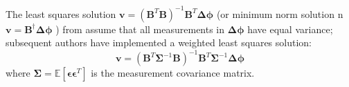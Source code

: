 
The least squares solution $ \bm{v} = (\bm{B}^T \bm{B})^{-1}\bm{B}^T \bm{\Delta \phi} $ (or minimum norm solution n $ \bm{v} = \bm{B}^{\dagger} \bm{\Delta \phi}$ ) from \cite{Berardino2002NewAlgorithmSurface} assume that all measurements in $\bm{\Delta \phi}$ have equal variance; subsequent authors have implemented a weighted least squares solution:
\begin{equation}
	\bm{v} = (\bm{B}^T \bm{\Sigma}^{-1} \bm{B})^{-1}\bm{B}^T \bm{\Sigma}^{-1} \bm{\Delta \phi}  \label{eq:ch3-sbas-wls}
\end{equation}
where $ \bm{\Sigma} = \mathbb{E}[\bm{\epsilon} \bm{\epsilon}^T] $ is the measurement covariance matrix.









